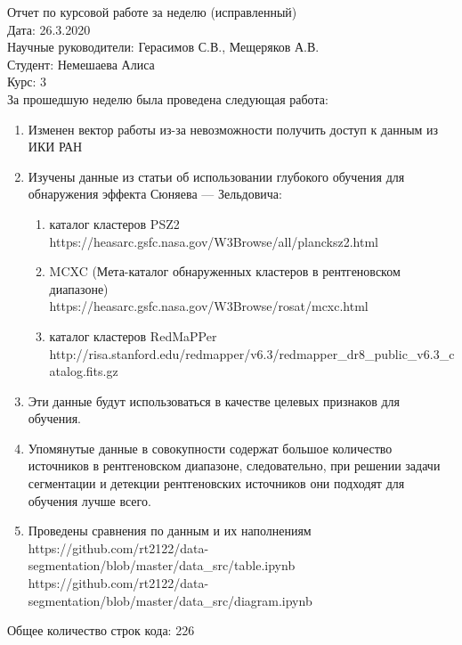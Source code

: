 \documentclass{article}
\begin{document}
Отчет по курсовой работе за неделю (исправленный)\\
Дата: 26.3.2020\\
Научные руководители: Герасимов С.В., Мещеряков А.В.\\
Студент: Немешаева Алиса\\
Курс: 3\\

За прошедшую неделю была проведена следующая работа:\\
\begin{enumerate}
    \item Изменен вектор работы из-за невозможности получить доступ к данным из ИКИ РАН \\
    \item Изучены данные из статьи об использовании глубокого обучения для обнаружения 
        эффекта Сюняева — Зельдовича: \\
        \begin{enumerate}
            \item каталог кластеров PSZ2 \\
                   https://heasarc.gsfc.nasa.gov/W3Browse/all/plancksz2.html\\
            \item MCXC (Мета-каталог обнаруженных кластеров в рентгеновском диапазоне) \\
                   https://heasarc.gsfc.nasa.gov/W3Browse/rosat/mcxc.html\\
            \item каталог кластеров RedMaPPer \\
                   http://risa.stanford.edu/redmapper/v6.3/redmapper\_dr8\_public\_v6.3\_catalog.fits.gz \\
        \end{enumerate}
    \item Эти данные будут использоваться в качестве целевых признаков для обучения. \\
    \item Упомянутые данные в совокупности содержат большое количество источников в рентгеновском 
    диапазоне, следовательно, при решении задачи сегментации и детекции рентгеновских источников они 
    подходят для обучения лучше всего. \\
    \item Проведены сравнения по данным и их наполнениям \\
               https://github.com/rt2122/data-segmentation/blob/master/data\_src/table.ipynb \\
               https://github.com/rt2122/data-segmentation/blob/master/data\_src/diagram.ipynb \\ 
\end{enumerate}

Общее количество строк кода: 226\\
\end{document}
